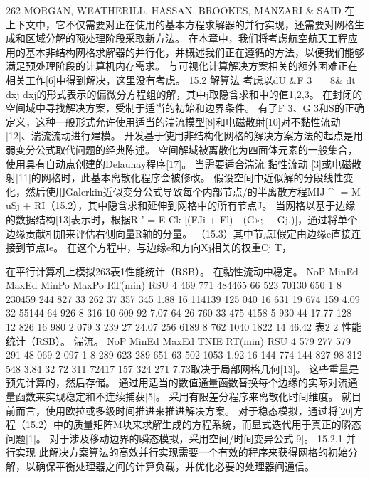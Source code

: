 \documentclass[UTF8,11pt,a4paper,openany,fontset=fandol]{ctexbook}
\begin{document}
262 MORGAN, WEATHERILL, HASSAN, BROOKES, MANZARI \& SAID 在上下文中，它不仅需要对正在使用的基本方程求解器的并行实现，还需要对网格生成和区域分解的预处理阶段采取新方法。 在本章中，我们将考虑航空航天工程应用的基本非结构网格求解器的并行化，并概述我们正在遵循的方法，以便我们能够满足预处理阶段的计算机内存需求。 与可视化计算解决方案相关的额外困难正在相关工作[6]中得到解决，这里没有考虑。 15.2 解算法 考虑以dU \&F 3\_\_ 8\& dt dxj dxj的形式表示的偏微分方程组的解，其中j取隐含求和中的值1,2,3。 在封闭的空间域中寻找解决方案，受制于适当的初始和边界条件。 有了F 3、G 3和S的正确定义，这种一般形式允许使用适当的湍流模型[8]和电磁散射[10]对不黏性流动[12]、湍流流动进行建模。 开发基于使用非结构化网格的解决方案方法的起点是用弱变分公式取代问题的经典陈述。 空间解域被离散化为四面体元素的一般集合，使用具有自动点创建的Delaunay程序[17]。 当需要适合湍流 黏性流动 [3]或电磁散射[11]的网格时，此基本离散化程序会被修改。 假设空间中近似解的分段线性变化，然后使用Galerkin近似变分公式导致每个内部节点/的半离散方程MIJ-\textasciicircum{}- = M uSj + RI（15.2），其中隐含求和延伸到网格中的所有节点J。 当网格以基于边缘的数据结构[13]表示时，根据R ' = E Ck [(FJi + Fl) - (G»; + Gj.)]，通过将单个边缘贡献相加来评估右侧向量R轴的分量。 （15.3）其中节点I假定由边缘e直接连接到节点Ie。 在这个方程中，与边缘e和方向Xj相关的权重Cj T，

在平行计算机上模拟263表1性能统计（RSB）。 在黏性流动中稳定。 NoP MinEd MaxEd MinPo MaxPo RT(min) RSU 4 469 771 484465 66 523 70130 650 1 8 230459 244 827 33 262 37 357 345 1.88 16 114139 125 040 16 631 19 674 159 4.09 32 55144 64 926 8 316 10 609 92 7.07 64 26 760 33 475 4158 5 930 44 17.77 128 12 826 16 980 2 079 3 239 27 24.07 256 6189 8 762 1040 1822 14 46.42 表2 2 性能统计（RSB）。 湍流。 NoP MinEd MaxEd TNIE RT(min) RSU 4 579 277 579 291 48 069 2 097 1 8 289 623 289 651 63 502 1053 1.92 16 144 774 144 827 98 312 548 3.84 32 72 311 72417 157 324 271 7.73取决于局部网格几何[13]。 这些重量是预先计算的，然后存储。 通过用适当的数值通量函数替换每个边缘的实际对流通量函数来实现稳定和不连续捕获[5]。 采用有限差分程序来离散化时间维度。 就目前而言，使用欧拉或多级时间推进来推进解决方案。 对于稳态模拟，通过将[20]方程（15.2）中的质量矩阵M块来求解生成的方程系统，而显式迭代用于真正的瞬态问题[1]。 对于涉及移动边界的瞬态模拟，采用空间/时间变异公式[9]。 15.2.1 并行实现 此解决方案算法的高效并行实现需要一个有效的程序来获得网格的初始分解，以确保平衡处理器之间的计算负载，并优化必要的处理器间通信。
\end{document}
